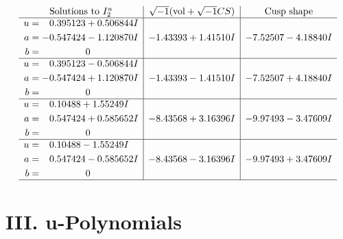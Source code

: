 \documentclass[1p]{elsarticle_modified}
\theoremstyle{definition}
\newcommand{\I}{\sqrt{-1}}
\begin{document}
$$\begin{array}{c|c|c}  
\text{Solutions to }I^u_{2}& \I (\text{vol} + \sqrt{-1}CS) & \text{Cusp shape}\\
 \hline 
\begin{aligned}
u &= \phantom{-}0.395123 + 0.506844 I \\
a &= -0.547424 - 1.120870 I \\
b &= \phantom{-0.000000 } 0\end{aligned}
 & -1.43393 + 1.41510 I & -7.52507 - 4.18840 I \\ \hline\begin{aligned}
u &= \phantom{-}0.395123 - 0.506844 I \\
a &= -0.547424 + 1.120870 I \\
b &= \phantom{-0.000000 } 0\end{aligned}
 & -1.43393 - 1.41510 I & -7.52507 + 4.18840 I \\ \hline\begin{aligned}
u &= \phantom{-}0.10488 + 1.55249 I \\
a &= \phantom{-}0.547424 + 0.585652 I \\
b &= \phantom{-0.000000 } 0\end{aligned}
 & -8.43568 + 3.16396 I & -9.97493 - 3.47609 I \\ \hline\begin{aligned}
u &= \phantom{-}0.10488 - 1.55249 I \\
a &= \phantom{-}0.547424 - 0.585652 I \\
b &= \phantom{-0.000000 } 0\end{aligned}
 & -8.43568 - 3.16396 I & -9.97493 + 3.47609 I\\
 \hline 
 \end{array}$$\newpage
\newpage\renewcommand{\arraystretch}{1}
\centering \section*{ III. u-Polynomials}
\end{document}
